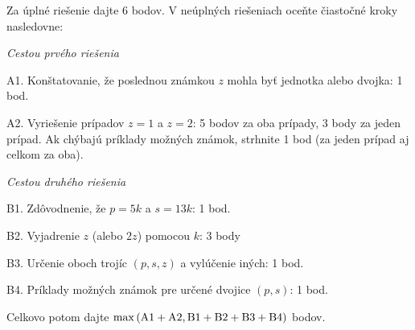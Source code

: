 {\schemaABC
Za úplné riešenie dajte 6 bodov. V neúplných riešeniach oceňte čiastočné
kroky nasledovne:

\medskip\noindent
{\it Cestou prvého riešenia}

\medskip\noindent
\item{A1.} Konštatovanie, že poslednou známkou $z$ mohla byť jednotka alebo dvojka: 1 bod.
\item{A2.} Vyriešenie prípadov $z=1$ a $z=2$: 5 bodov za oba prípady, 3 body za jeden prípad. Ak chýbajú príklady možných známok, strhnite 1 bod (za jeden prípad aj celkom za oba).

\medskip\noindent
{\it Cestou druhého riešenia}

\medskip\noindent
\item{B1.} Zdôvodnenie, že $p=5k$ a $s=13k$: 1 bod.
\item{B2.} Vyjadrenie $z$ (alebo $2z$) pomocou $k$: 3 body
\item{B3.} Určenie oboch trojíc $(p,s,z)$ a vylúčenie iných: 1 bod.
\item{B4.} Príklady možných známok pre určené dvojice $(p,s)$: 1 bod.

\medskip\noindent
Celkovo potom dajte $\rm \max\left(A1+A2,B1+B2+B3+B4\right)$ bodov.
\endschema
}

